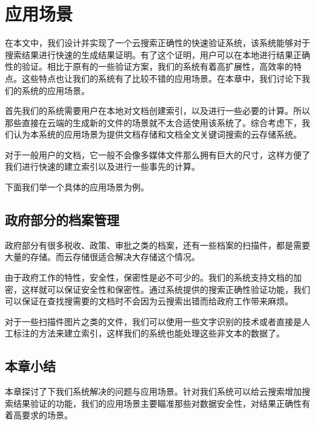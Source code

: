 \chapter{应用场景}
\label{chap:application}
在本文中，我们设计并实现了一个云搜索正确性的快速验证系统，该系统能够对于搜索结果进行快速的生成结果证明。有了这个证明，用户可以在本地进行结果正确性的验证。相比于原有的一些验证方案，我们的系统有着高扩展性，高效率的特点。这些特点也让我们的系统有了比较不错的应用场景。在本章中，我们讨论下我们的系统的应用场景。

首先我们的系统需要用户在本地对文档创建索引，以及进行一些必要的计算。所以那些直接在云端的生成新的文件的场景就不太合适使用该系统了。综合考虑下，我们认为本系统的应用场景为提供文档存储和文档全文关键词搜索的云存储系统。

对于一般用户的文档，它一般不会像多媒体文件那么拥有巨大的尺寸，这样方便了我们进行快速的建立索引以及进行一些事先的计算。

下面我们举一个具体的应用场景为例。

\section{政府部分的档案管理}
政府部分有很多税收、政策、审批之类的档案，还有一些档案的扫描件，都是需要大量的存储。而云存储很适合解决大存储这个情况。

由于政府工作的特性，安全性，保密性是必不可少的。我们的系统支持文档的加密，这样就可以保证安全性和保密性。通过系统提供的搜索正确性验证功能，我们可以保证在查找搜需要的文档时不会因为云搜索出错而给政府工作带来麻烦。

对于一些扫描件图片之类的文件，我们可以使用一些文字识别的技术或者直接是人工标注的方法来建立索引，这样我们的系统也能处理这些非文本的数据了。

\section{本章小结}
本章探讨了下我们系统解决的问题与应用场景。针对我们系统可以给云搜索增加搜索结果验证的功能，我们的应用场景主要瞄准那些对数据安全性，对结果正确性有着高要求的场景。
